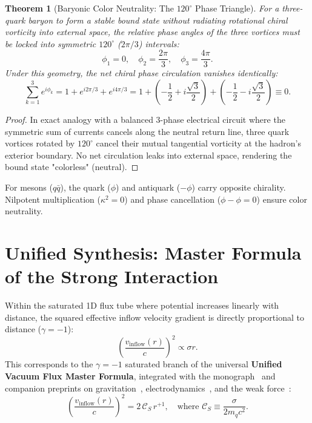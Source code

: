 \documentclass[11pt,a4paper]{article}
\newtheorem{theorem}{Theorem}[section]
\begin{document}
\begin{theorem}[Baryonic Color Neutrality: The $120^\circ$ Phase Triangle]
    \label{thm:renk_notrlesmesi_p3}
    For a three-quark baryon to form a stable bound state without radiating rotational chiral vorticity into external space, the relative phase angles of the three vortices must be locked into symmetric $120^\circ$ ($2\pi/3$) intervals:
    \begin{equation}
        \phi_1 = 0, \quad \phi_2 = \frac{2\pi}{3}, \quad \phi_3 = \frac{4\pi}{3}.
        \label{eq:faz_acilari_120_p3}
    \end{equation}
    Under this geometry, the net chiral phase circulation vanishes identically:
    \begin{equation}
        \sum_{k=1}^3 e^{i \phi_k} = 1 + e^{i 2\pi/3} + e^{i 4\pi/3} = 1 + \left( -\frac{1}{2} + i\frac{\sqrt{3}}{2} \right) + \left( -\frac{1}{2} - i\frac{\sqrt{3}}{2} \right) \equiv 0.
        \label{eq:renk_faz_toplami_p3}
    \end{equation}
\end{theorem}

\begin{proof}
    In exact analogy with a balanced 3-phase electrical circuit where the symmetric sum of currents cancels along the neutral return line, three quark vortices rotated by $120^\circ$ cancel their mutual tangential vorticity at the hadron's exterior boundary. No net circulation leaks into external space, rendering the bound state "colorless" (neutral).
\end{proof}

For mesons ($q\bar{q}$), the quark ($\phi$) and antiquark ($-\phi$) carry opposite chirality. Nilpotent multiplication ($\kappa^2 = 0$) and phase cancellation ($\phi - \phi = 0$) ensure color neutrality.

\section{Unified Synthesis: Master Formula of the Strong Interaction}
\label{sec:ana_formul_guclu}

Within the saturated 1D flux tube where potential increases linearly with distance, the squared effective inflow velocity gradient is directly proportional to distance ($\gamma = -1$):
\begin{equation}
    \left( \frac{v_{\mathrm{inflow}}(r)}{c} \right)^2 \propto \sigma r.
    \label{eq:guclu_master_tr}
\end{equation}
This corresponds to the $\gamma = -1$ saturated branch of the universal \textbf{Unified Vacuum Flux Master Formula}, integrated with the monograph~\cite{main_paper} and companion preprints on gravitation~\cite{paper1}, electrodynamics~\cite{paper2}, and the weak force~\cite{paper4}:
\begin{equation}
    \boxed{ \left( \frac{v_{\mathrm{inflow}}(r)}{c} \right)^2 = 2 \, \mathcal{C}_S \, r^{+1}, \quad \text{where } \mathcal{C}_S \equiv \frac{\sigma}{2 m_q c^2}. }
\end{equation}
\end{document}
